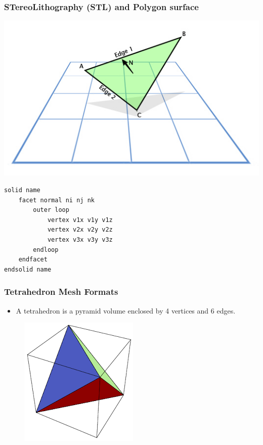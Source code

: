 \documentclass[notes=hide]{beamer}
\begin{document}
{\begin{frame}[fragile]
\frametitle{STereoLithography (STL) and Polygon surface}
\hfill \includegraphics[scale=0.3]{facet_normal.jpg}\hfill\hfill

\begin{lstlisting}
solid name
	facet normal ni nj nk
		outer loop
		    vertex v1x v1y v1z
		    vertex v2x v2y v2z
		    vertex v3x v3y v3z
		endloop
	endfacet
endsolid name
\end{lstlisting}

\end{frame}

\begin{frame}
\frametitle{Tetrahedron Mesh Formats}
\begin{itemize}
\item A tetrahedron is a pyramid volume enclosed by 4 vertices and 6 edges.
\end{itemize}
\begin{figure}
\includegraphics[scale=0.55]{tetra.png}


\end{figure}
\end{frame}}
\end{document}
